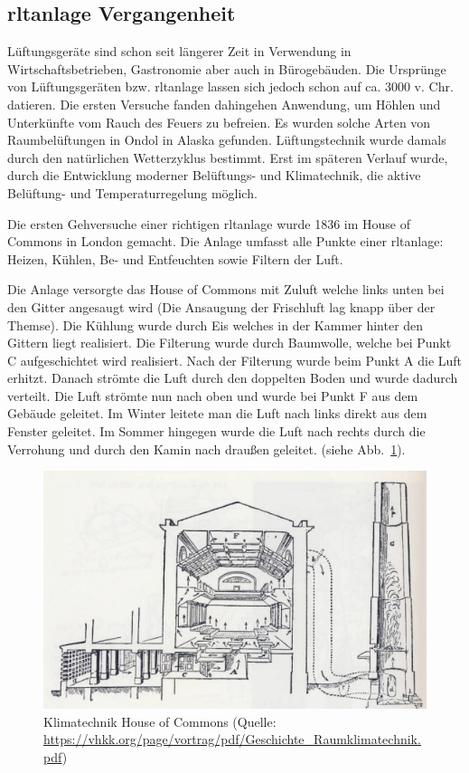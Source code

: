 \subsection{\ac{rltanlage} Vergangenheit}
Lüftungsgeräte sind schon seit längerer Zeit in Verwendung \zB in Wirtschaftsbetrieben, Gastronomie aber auch in Bürogebäuden. Die Ursprünge von Lüftungsgeräten bzw. \ac{rltanlage} lassen sich jedoch schon auf ca. 3000 v. Chr. datieren.
Die ersten Versuche fanden dahingehen Anwendung, um Höhlen und Unterkünfte vom Rauch des Feuers zu befreien. Es wurden solche Arten von Raumbelüftungen \zB in Ondol in Alaska gefunden.
Lüftungstechnik wurde damals durch den natürlichen Wetterzyklus bestimmt. 
Erst im späteren Verlauf wurde, durch die Entwicklung moderner Belüftungs- und Klimatechnik, die aktive Belüftung- und Temperaturregelung möglich.

Die ersten Gehversuche einer richtigen \acs{rltanlage} wurde 1836 im House of Commons in London gemacht. Die Anlage umfasst alle Punkte einer \acs{rltanlage}: Heizen, Kühlen, Be- und Entfeuchten sowie Filtern der Luft. 

Die Anlage versorgte das House of Commons mit Zuluft welche links unten bei den Gitter angesaugt wird (Die Ansaugung der Frischluft lag knapp über der Themse). Die Kühlung wurde durch Eis welches in der Kammer hinter den Gittern liegt realisiert.
Die Filterung wurde durch Baumwolle, welche bei Punkt C aufgeschichtet wird realisiert.
Nach der Filterung wurde beim Punkt A die Luft erhitzt. 
Danach strömte die Luft durch den doppelten Boden und wurde dadurch verteilt. Die Luft strömte nun nach oben und wurde bei Punkt F aus dem Gebäude geleitet. Im Winter leitete man die Luft nach links direkt aus dem Fenster geleitet. Im Sommer hingegen wurde die Luft nach rechts durch die Verrohung und durch den Kamin  nach draußen geleitet. 
(siehe Abb.~\ref{fig:House_of_Commons_Klimatechnik}).
\cite{Fitzner_Finke:2010} 

\begin{figure}[ht]
	\centering
	\includegraphics[width=0.6\linewidth]{Bilder/Belueftung_House_of_Commons}
	\caption{Klimatechnik House of Commons  (Quelle: \url{https://vhkk.org/page/vortrag/pdf/Geschichte_Raumklimatechnik.pdf})}
	\label{fig:House_of_Commons_Klimatechnik}
\end{figure}



